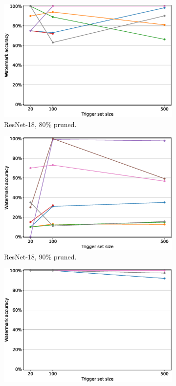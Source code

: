 \begin{figure}
\begin{subfigure}{0.4\linewidth}
        \includegraphics[width=\linewidth]{images/pruning/resnet18_pruning_per_arch_08.eps}
        \caption{ResNet-18, 80\% pruned.}
        \label{fig:pruning-0.8-resnet18}
    \end{subfigure}
    \quad
    \begin{subfigure}{0.4\linewidth}
        \includegraphics[width=\linewidth]{images/pruning/resnet18_pruning_per_arch_09.eps}
        \caption{ResNet-18, 90\% pruned.}
        \label{fig:pruning-0.9-resnet18}
    \end{subfigure}
    \quad
    \begin{subfigure}{0.4\linewidth}
        \includegraphics[width=\linewidth]{images/pruning/resnet34_pruning_per_arch_08.eps}

\end{subfigure}
\end{figure}

